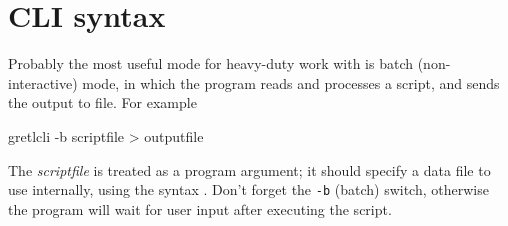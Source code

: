 \section{CLI syntax}
\label{cli-syntax}

Probably the most useful mode for heavy-duty work with 
is batch (non-interactive) mode, in which the program reads and
processes a script, and sends the output to file.  For example
\begin{code}
    gretlcli -b scriptfile > outputfile
\end{code}

The \textsl{scriptfile} is treated as a program argument; it should
specify a data file to use internally, using the syntax .  Don't forget the \texttt{-b} (batch) switch, otherwise
the program will wait for user input after executing the script.

    


